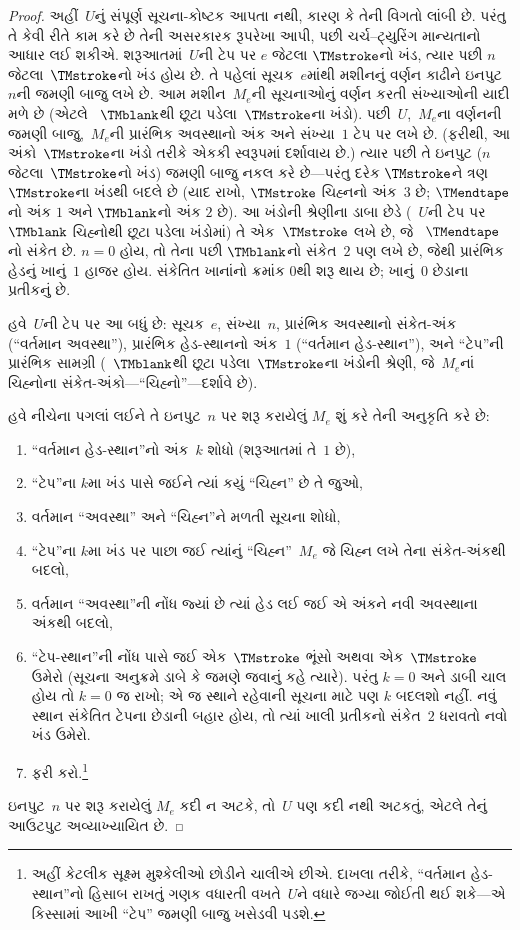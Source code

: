 \begin{proof}
  અહીં~$U$નું સંપૂર્ણ સૂચના-કોષ્ટક આપતા નથી, કારણ કે તેની
  વિગતો લાંબી છે. પરંતુ તે કેવી રીતે કામ કરે છે તેની
  અસરકારક રૂપરેખા આપી, પછી ચર્ચ--ટ્યુરિંગ માન્યતાનો
  આધાર લઈ શકીએ. શરૂઆતમાં~$U$ની ટેપ પર $e$ જેટલા
  $\TMstroke$નો ખંડ, ત્યાર પછી $n$ જેટલા~$\TMstroke$નો
  ખંડ હોય છે. તે પહેલાં સૂચક~$e$માંથી મશીનનું વર્ણન
  કાઢીને ઇનપુટ~$n$ની જમણી બાજુ લખે છે. આમ મશીન~$M_e$ની
  સૂચનાઓનું વર્ણન કરતી સંખ્યાઓની યાદી મળે છે (એટલે
  ~$\TMblank$થી છૂટા પડેલા~$\TMstroke$ના ખંડો).
  પછી~$U$,~$M_e$ના વર્ણનની જમણી બાજુ,~$M_e$ની પ્રારંભિક
  અવસ્થાનો અંક અને સંખ્યા~$1$ ટેપ પર લખે છે. (ફરીથી,
  આ અંકો~$\TMstroke$ના ખંડો તરીકે એકકી સ્વરૂપમાં દર્શાવાય
  છે.) ત્યાર પછી તે ઇનપુટ ($n$ જેટલા~$\TMstroke$નો ખંડ)
  જમણી બાજુ નકલ કરે છે---પરંતુ દરેક $\TMstroke$ને
  ત્રણ $\TMstroke$ના ખંડથી બદલે છે (યાદ રાખો,
  $\TMstroke$ ચિહ્નનો અંક~$3$ છે; $\TMendtape$નો અંક
  $1$ અને $\TMblank$નો અંક $2$ છે). આ ખંડોની શ્રેણીના
  ડાબા છેડે (~$U$ની ટેપ પર $\TMblank$ ચિહ્નોથી છૂટા
  પડેલા ખંડોમાં) તે એક~$\TMstroke$ લખે છે, જે
  ~$\TMendtape$નો સંકેત છે. $n=0$ હોય, તો તેના પછી
  $\TMblank$નો સંકેત~$2$ પણ લખે છે, જેથી પ્રારંભિક
  હેડનું ખાનું~$1$ હાજર હોય. સંકેતિત ખાનાંનો ક્રમાંક
  $0$થી શરૂ થાય છે; ખાનું~$0$ છેડાના પ્રતીકનું છે.

  હવે~$U$ની ટેપ પર આ બધું છે: સૂચક~$e$, સંખ્યા~$n$,
  પ્રારંભિક અવસ્થાનો સંકેત-અંક (``વર્તમાન અવસ્થા''),
  પ્રારંભિક હેડ-સ્થાનનો અંક~$1$ (``વર્તમાન હેડ-સ્થાન''),
  અને ``ટેપ''ની પ્રારંભિક સામગ્રી (~$\TMblank$થી છૂટા
  પડેલા~$\TMstroke$ના ખંડોની શ્રેણી, જે~$M_e$નાં
  ચિહ્નોના સંકેત-અંકો---``ચિહ્નો''---દર્શાવે છે).

  હવે નીચેના પગલાં લઈને તે ઇનપુટ~$n$ પર શરૂ કરાયેલું
  $M_e$ શું કરે તેની અનુકૃતિ કરે છે:
  \begin{enumerate}
    \item ``વર્તમાન હેડ-સ્થાન''નો અંક~$k$ શોધો
    (શરૂઆતમાં તે~$1$ છે),
    \item ``ટેપ''ના $k$મા ખંડ પાસે જઈને ત્યાં કયું
    ``ચિહ્ન'' છે તે જુઓ,
    \item{}%
    વર્તમાન ``અવસ્થા'' અને ``ચિહ્ન''ને મળતી સૂચના શોધો,
    \item ``ટેપ''ના $k$મા ખંડ પર પાછા જઈ ત્યાંનું
    ``ચિહ્ન''~$M_e$ જે ચિહ્ન લખે તેના સંકેત-અંકથી બદલો,
    \item વર્તમાન ``અવસ્થા''ની નોંધ જ્યાં છે ત્યાં હેડ
    લઈ જઈ એ અંકને નવી અવસ્થાના અંકથી બદલો,
    \item ``ટેપ-સ્થાન''ની નોંધ પાસે જઈ એક~$\TMstroke$
    ભૂંસો અથવા એક~$\TMstroke$ ઉમેરો (સૂચના અનુક્રમે
    ડાબે કે જમણે જવાનું કહે ત્યારે). પરંતુ $k=0$ અને
    ડાબી ચાલ હોય તો $k=0$ જ રાખો; એ જ સ્થાને રહેવાની
    સૂચના માટે પણ $k$ બદલશો નહીં. નવું સ્થાન સંકેતિત
    ટેપના છેડાની બહાર હોય, તો ત્યાં ખાલી પ્રતીકનો સંકેત~$2$
    ધરાવતો નવો ખંડ ઉમેરો.
    \item ફરી કરો.\footnote{અહીં કેટલીક સૂક્ષ્મ મુશ્કેલીઓ
    છોડીને ચાલીએ છીએ. દાખલા તરીકે, ``વર્તમાન હેડ-સ્થાન''નો
    હિસાબ રાખતું ગણક વધારતી વખતે~$U$ને વધારે જગ્યા
    જોઈતી થઈ શકે---એ કિસ્સામાં આખી ``ટેપ'' જમણી બાજુ
    ખસેડવી પડશે.}
  \end{enumerate}
  ઇનપુટ~$n$ પર શરૂ કરાયેલું $M_e$ કદી ન અટકે, તો~$U$
  પણ કદી નથી અટકતું, એટલે તેનું આઉટપુટ અવ્યાખ્યાયિત છે.


\end{proof}
